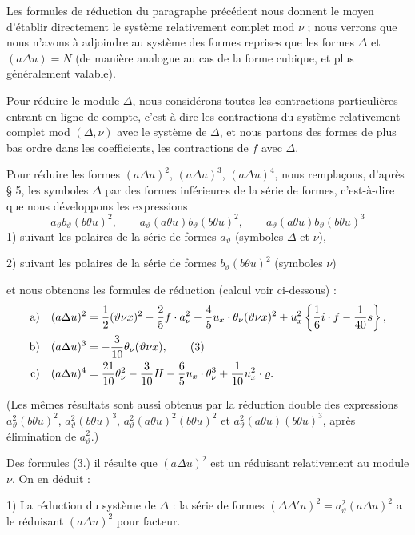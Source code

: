 \documentclass[11pt]{article}
\newcommand{\A}{\Delta}
\begin{document}
Les formules de réduction du paragraphe précédent nous donnent le moyen d'établir directement le système relativement complet mod $\nu$ ; nous verrons que nous n'avons à adjoindre au système des formes reprises que les formes $\A$ et $(a\A u)=N$ (de manière analogue au cas de la forme cubique, et plus généralement valable).

Pour réduire le module $\A$, nous considérons toutes les contractions particulières entrant en ligne de compte, c'est-à-dire les contractions du système relativement complet mod $(\A,\nu)$ avec le système de $\A$, et nous partons des formes de plus bas ordre dans les coefficients, les contractions de $f$ avec $\A$.

Pour réduire les formes $(a\A u)^2$, $(a\A u)^3$, $(a\A u)^4$, nous remplaçons, d'après \S{} 5, les symboles $\A$ par des formes inférieures de la série de formes, c'est-à-dire que nous développons les expressions
\[
a_\vartheta b_\vartheta(b\theta u)^2,\qquad
a_\vartheta(a\theta u)b_\vartheta(b\theta u)^2,\qquad
a_\vartheta(a\theta u)b_\vartheta(b\theta u)^3
\]
1) suivant les polaires de la série de formes $a_\vartheta$ (symboles $\A$ et $\nu$),

2) suivant les polaires de la série de formes $b_\vartheta(b\theta u)^2$ (symboles $\nu$)

et nous obtenons les formules de réduction (calcul voir ci-dessous) :
\begin{align}
\text{a)}\quad (a\A u)^2
&=\frac12(\vartheta\nu x)^2-\frac25 f\cdot a_\nu^2
-\frac45u_x\cdot\theta_\nu(\vartheta\nu x)^2
+u_x^2\left\{\frac16i\cdot f-\frac1{40}s\right\},\notag\\
\text{b)}\quad (a\A u)^3
&=-\frac3{10}\theta_\nu(\vartheta\nu x),\tag{3}\\
\text{c)}\quad (a\A u)^4
&=\frac{21}{10}\theta_\nu^2-\frac3{10}H
-\frac65u_x\cdot\theta_\nu^3+\frac1{10}u_x^2\cdot\varrho.\notag
\end{align}

(Les mêmes résultats sont aussi obtenus par la réduction double des expressions $a_\vartheta^2(b\theta u)^2$, $a_\vartheta^2(b\theta u)^3$, $a_\vartheta^2(a\theta u)^2(b\theta u)^2$ et $a_\vartheta^2(a\theta u)(b\theta u)^3$, après élimination de $a_\vartheta^2$.)

Des formules (3.) il résulte que $(a\A u)^2$ est un réduisant relativement au module $\nu$. On en déduit :

1) La réduction du système de $\A$ : la série de formes $(\A\A' u)^2=a_\vartheta^2(a\A u)^2$ a le réduisant $(a\A u)^2$ pour facteur.
\end{document}

